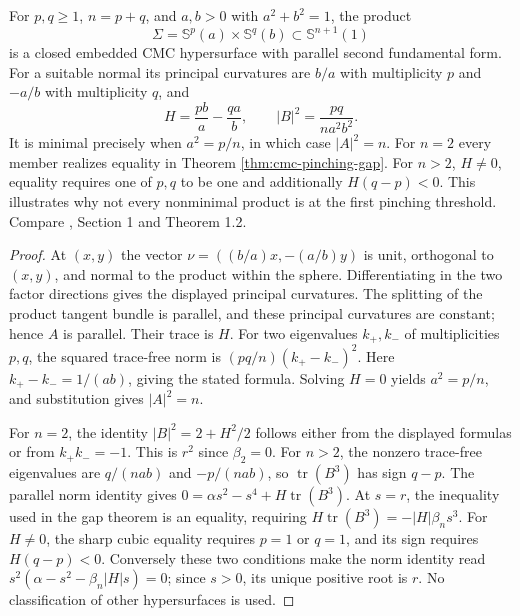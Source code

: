 \begin{example}\label{ex:cmc-product-pinching}
For $p,q\geq1$, $n=p+q$, and $a,b>0$ with $a^2+b^2=1$, the product
\[
 \Sigma=\mathbb S^p(a)\times\mathbb S^q(b)\subset\mathbb S^{n+1}(1)
\]
is a closed embedded CMC hypersurface with parallel second fundamental form. For a suitable normal its principal curvatures are $b/a$ with multiplicity $p$ and $-a/b$ with multiplicity $q$, and
\[
 H=\frac{pb}{a}-\frac{qa}{b},\qquad
 |B|^2=\frac{pq}{n a^2b^2}.
\]
It is minimal precisely when $a^2=p/n$, in which case $|A|^2=n$. For $n=2$ every member realizes equality in Theorem \ref{thm:cmc-pinching-gap}. For $n>2$, $H\ne0$, equality requires one of $p,q$ to be one and additionally $H(q-p)<0$. This illustrates why not every nonminimal product is at the first pinching threshold. Compare \cite{AdC94}, Section 1 and Theorem 1.2.
\end{example}
\begin{proof}
At $(x,y)$ the vector $\nu=((b/a)x,-(a/b)y)$ is unit, orthogonal to $(x,y)$, and normal to the product within the sphere. Differentiating in the two factor directions gives the displayed principal curvatures. The splitting of the product tangent bundle is parallel, and these principal curvatures are constant; hence $A$ is parallel. Their trace is $H$. For two eigenvalues $k_+,k_-$ of multiplicities $p,q$, the squared trace-free norm is $(pq/n)(k_+-k_-)^2$. Here $k_+-k_-=1/(ab)$, giving the stated formula. Solving $H=0$ yields $a^2=p/n$, and substitution gives $|A|^2=n$.

For $n=2$, the identity $|B|^2=2+H^2/2$ follows either from the displayed formulas or from $k_+k_-=-1$. This is $r^2$ since $\beta_2=0$. For $n>2$, the nonzero trace-free eigenvalues are $q/(nab)$ and $-p/(nab)$, so $\operatorname{tr}(B^3)$ has sign $q-p$. The parallel norm identity gives
$0=\alpha s^2-s^4+H\operatorname{tr}(B^3)$.
At $s=r$, the inequality used in the gap theorem is an equality, requiring $H\operatorname{tr}(B^3)=-|H|\beta_n s^3$. For $H\ne0$, the sharp cubic equality requires $p=1$ or $q=1$, and its sign requires $H(q-p)<0$. Conversely these two conditions make the norm identity read $s^2(\alpha-s^2-\beta_n|H|s)=0$; since $s>0$, its unique positive root is $r$. No classification of other hypersurfaces is used.
\end{proof}
